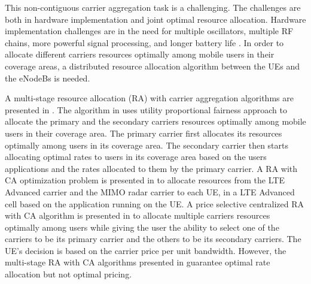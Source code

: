 \documentclass[journal]{IEEEtran} 		\usepackage{amsmath,amssymb}
\begin{document}
This non-contiguous carrier aggregation task is a challenging. The challenges are both in hardware implementation and joint optimal resource allocation. Hardware implementation challenges are in the need for multiple oscillators, multiple RF chains, more powerful signal processing, and longer battery life \cite{RebeccaThesis}. In order to allocate different carriers resources optimally among mobile users in their coverage areas, a distributed resource allocation algorithm between the UEs and the eNodeBs is needed.

A multi-stage resource allocation (RA) with carrier aggregation algorithms are presented in \cite{Haya_Utility1,Haya_Utility3,Haya_Utility6}. The algorithm in \cite{Haya_Utility1} uses utility proportional fairness approach to allocate the primary and the secondary carriers resources optimally among mobile users in their coverage area. The primary carrier first allocates its resources optimally among users in its coverage area. The secondary carrier then starts allocating optimal rates to users in its coverage area based on the users applications and the rates allocated to them by the primary carrier. A RA with CA optimization problem is presented in \cite{Haya_Utility3} to allocate resources from the LTE Advanced carrier and the MIMO radar carrier to each UE, in a LTE Advanced cell based on the application running on the UE. A price selective centralized RA with CA algorithm is presented in \cite{Haya_Utility6} to allocate multiple carriers resources optimally among users while giving the user the ability
to select one of the carriers to be its primary carrier and the others to be its secondary carriers. The UE's decision is based on the carrier price per unit bandwidth. However, the multi-stage RA with CA algorithms presented in \cite{Haya_Utility1,Haya_Utility3,Haya_Utility6} guarantee optimal rate allocation but not optimal pricing.
\end{document}

